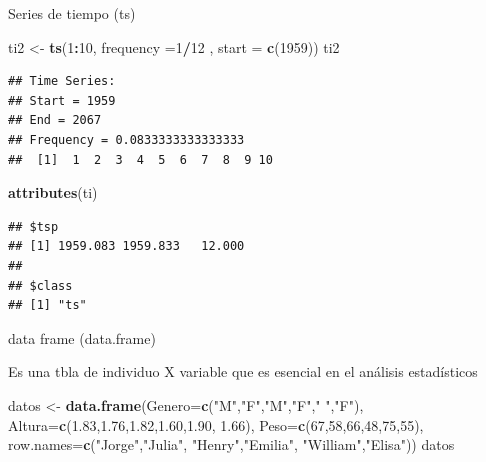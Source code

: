 \documentclass[ignorenonframetext,]{beamer}
\newenvironment{Shaded}{\begin{snugshade}}{\end{snugshade}}
\newcommand{\KeywordTok}[1]{\textcolor[rgb]{0.13,0.29,0.53}{\textbf{#1}}}
\newcommand{\DataTypeTok}[1]{\textcolor[rgb]{0.13,0.29,0.53}{#1}}
\newcommand{\DecValTok}[1]{\textcolor[rgb]{0.00,0.00,0.81}{#1}}
\newcommand{\FloatTok}[1]{\textcolor[rgb]{0.00,0.00,0.81}{#1}}
\newcommand{\StringTok}[1]{\textcolor[rgb]{0.31,0.60,0.02}{#1}}
\newcommand{\OperatorTok}[1]{\textcolor[rgb]{0.81,0.36,0.00}{\textbf{#1}}}
\newcommand{\NormalTok}[1]{#1}
\begin{document}
\begin{frame}[fragile]{Series de tiempo (ts)}

\begin{Shaded}
\begin{Highlighting}[]
\NormalTok{ti2 <-}\StringTok{ }\KeywordTok{ts}\NormalTok{(}\DecValTok{1}\OperatorTok{:}\DecValTok{10}\NormalTok{, }\DataTypeTok{frequency =}\DecValTok{1}\OperatorTok{/}\DecValTok{12}\NormalTok{ , }\DataTypeTok{start =} \KeywordTok{c}\NormalTok{(}\DecValTok{1959}\NormalTok{))}
\NormalTok{ti2}
\end{Highlighting}
\end{Shaded}

\begin{verbatim}
## Time Series:
## Start = 1959 
## End = 2067 
## Frequency = 0.0833333333333333 
##  [1]  1  2  3  4  5  6  7  8  9 10
\end{verbatim}

\begin{Shaded}
\begin{Highlighting}[]
\KeywordTok{attributes}\NormalTok{(ti)}
\end{Highlighting}
\end{Shaded}

\begin{verbatim}
## $tsp
## [1] 1959.083 1959.833   12.000
## 
## $class
## [1] "ts"
\end{verbatim}

\end{frame}

\begin{frame}[fragile]{data frame (data.frame)}

Es una tbla de individuo X variable que es esencial en el análisis
estadísticos

\begin{Shaded}
\begin{Highlighting}[]
\NormalTok{datos <-}\StringTok{ }\KeywordTok{data.frame}\NormalTok{(}\DataTypeTok{Genero=}\KeywordTok{c}\NormalTok{(}\StringTok{"M"}\NormalTok{,}\StringTok{"F"}\NormalTok{,}\StringTok{"M"}\NormalTok{,}\StringTok{"F"}\NormalTok{,}\StringTok{" "}\NormalTok{,}\StringTok{"F"}\NormalTok{),}
                    \DataTypeTok{Altura=}\KeywordTok{c}\NormalTok{(}\FloatTok{1.83}\NormalTok{,}\FloatTok{1.76}\NormalTok{,}\FloatTok{1.82}\NormalTok{,}\FloatTok{1.60}\NormalTok{,}\FloatTok{1.90}\NormalTok{,}
                             \FloatTok{1.66}\NormalTok{),}
                    \DataTypeTok{Peso=}\KeywordTok{c}\NormalTok{(}\DecValTok{67}\NormalTok{,}\DecValTok{58}\NormalTok{,}\DecValTok{66}\NormalTok{,}\DecValTok{48}\NormalTok{,}\DecValTok{75}\NormalTok{,}\DecValTok{55}\NormalTok{),}
                    \DataTypeTok{row.names=}\KeywordTok{c}\NormalTok{(}\StringTok{"Jorge"}\NormalTok{,}\StringTok{"Julia"}\NormalTok{,}
                                \StringTok{"Henry"}\NormalTok{,}\StringTok{"Emilia"}\NormalTok{,}
                                \StringTok{"William"}\NormalTok{,}\StringTok{"Elisa"}\NormalTok{))}
\NormalTok{datos}
\end{Highlighting}
\end{Shaded}

\end{frame}
\end{document}
